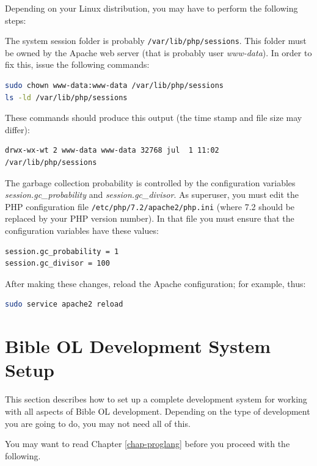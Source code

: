 \documentclass[11pt,oneside,a4paper]{memoir}
\begin{document}
Depending on your Linux distribution, you may have to perform the following steps:

The system session folder is probably \texttt{/var/lib/php/sessions}. This folder must be owned by
the Apache web server (that is probably user \emph{www-data}). In order to fix this, issue the
following commands:

\begin{lstlisting}[language=bash]
sudo chown www-data:www-data /var/lib/php/sessions
ls -ld /var/lib/php/sessions
\end{lstlisting}

These commands should produce this output (the time stamp and file size may differ):

\begin{lstlisting}
drwx-wx-wt 2 www-data www-data 32768 jul  1 11:02 /var/lib/php/sessions
\end{lstlisting}


The garbage collection probability is controlled by the configuration variables
\emph{session.gc\_probability} and \emph{session.gc\_divisor}. As superuser, you must edit the PHP
configuration file \texttt{/etc/php/7.2/apache2/php.ini} (where 7.2 should be replaced by your PHP
version number). In that file you must ensure that the configuration variables have these values:

\begin{lstlisting}
session.gc_probability = 1
session.gc_divisor = 100
\end{lstlisting}

After making these changes, reload the Apache configuration; for example, thus:

\begin{lstlisting}[language=bash]
sudo service apache2 reload
\end{lstlisting}



\section{Bible OL Development System Setup}\label{sec-devel}

This section describes how to set up a complete development system for working with all aspects of
Bible OL development. Depending on the type of development you are going to do, you may not need all
of this.

You may want to read Chapter \ref{chap-proglang} before you proceed with the following.
\end{document}
